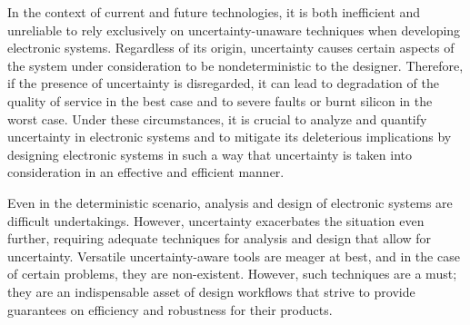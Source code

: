 In the context of current and future technologies, it is both inefficient and
unreliable to rely exclusively on uncertainty-unaware techniques when developing
electronic systems. Regardless of its origin, uncertainty causes certain aspects
of the system under consideration to be nondeterministic to the designer.
Therefore, if the presence of uncertainty is disregarded, it can lead to
degradation of the quality of service in the best case and to severe faults or
burnt silicon in the worst case. Under these circumstances, it is crucial to
analyze and quantify uncertainty in electronic systems and to mitigate its
deleterious implications by designing electronic systems in such a way that
uncertainty is taken into consideration in an effective and efficient manner.

Even in the deterministic scenario, analysis and design of electronic systems
are difficult undertakings. However, uncertainty exacerbates the situation even
further, requiring adequate techniques for analysis and design that allow for
uncertainty. Versatile uncertainty-aware tools are meager at best, and in the
case of certain problems, they are non-existent. However, such techniques are a
must; they are an indispensable asset of design workflows that strive to provide
guarantees on efficiency and robustness for their products.

